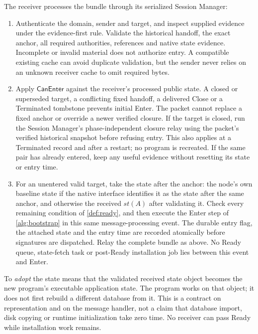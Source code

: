 \documentclass[11pt,a4paper]{article}
\newcommand{\tagg}[1]{\ensuremath{\mathsf{#1}}}
\begin{document}
The receiver processes the bundle through its serialized Session Manager:
\begin{enumerate}[label=(\roman*),itemsep=2pt]
\item Authenticate the domain, sender and target, and inspect supplied
evidence under the evidence-first rule. Validate the historical handoff,
the exact anchor, all required authorities, references and native state
evidence. Incomplete or invalid material does not authorize entry. A
compatible existing cache can avoid duplicate validation, but the sender
never relies on an unknown receiver cache to omit required bytes.
\item Apply $\tagg{CanEnter}$ against the receiver's processed public
state. A closed or superseded target, a conflicting fixed handoff, a
delivered Close or a Terminated tombstone prevents initial Enter. The packet cannot
replace a fixed anchor or override a newer verified closure. If the
target is closed, run the Session Manager's phase-independent closure
relay using the packet's verified historical snapshot before refusing
entry. This also applies at a Terminated record and after a restart; no
program is recreated. If the same pair has already entered, keep
any useful evidence without resetting its state or entry time.
\item For an unentered valid target, take the state after the anchor:
the node's own baseline state if the native interface identifies it as
the state after the same anchor, and otherwise the received $\mathit{st}(A)$ after
validating it. Check every remaining condition of \cref{def:ready}, and
then execute the Enter step of \cref{alg:bootstrap} in this same
message-processing event. The durable entry flag, the attached state and
the entry time are recorded atomically before signatures are dispatched.
Relay the complete bundle as above. No Ready queue, state-fetch task or
post-Ready installation job lies between this event and Enter.
\end{enumerate}

To \emph{adopt} the state means that the validated received state object
becomes the new program's executable application state. The program works
on that object; it does not first rebuild a different database from it.
This is a contract on representation and on the message handler, not a
claim that database import, disk copying or runtime initialization take
zero time. No receiver can pass Ready while installation work remains.
\end{document}
